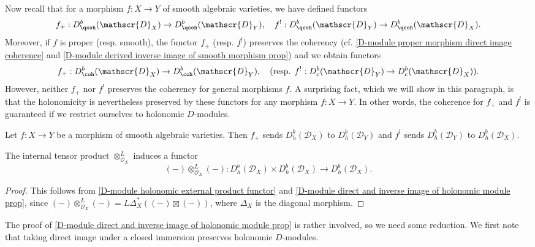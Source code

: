 Now recall that for a morphism $f:X\to Y$ of smooth algebraic varieties, we have defined functors
\[f_+:D^b_{\qcoh}(\mathscr{D}_X)\to D^b_{\qcoh}(\mathscr{D}_Y),\quad f^!:D^b_{\qcoh}(\mathscr{D}_Y)\to D^b_{\qcoh}(\mathscr{D}_X).\]
Moreover, if $f$ is proper (resp. smooth), the functor $f_+$ (resp. $f^!$) preserves the coherency (cf. \cref{D-module proper morphism direct image coherence} and \cref{D-module derived inverse image of smooth morphism prop}) and we obtain functors
\[f_+:D^b_{\coh}(\mathscr{D}_X)\to D^b_{\coh}(\mathscr{D}_Y),\quad \text{(resp. $f^!:D^b_c(\mathscr{D}_Y)\to D^b_c(\mathscr{D}_X)$)}.\]
However, neither $f_+$ nor $f^!$ preserves the coherency for general morphisms $f$. A surprising fact, which we will show in this paragraph, is that the holonomicity is nevertheless preserved by these functors for any morphism $f:X\to Y$. In other words, the coherence for $f_+$ and $f^!$ is guaranteed if we restrict ourselves to holonomic $D$-modules.

\begin{theorem}\label{D-module direct and inverse image of holonomic module prop}
Let $f:X\to Y$ be a morphism of smooth algebraic varieties. Then $f_+$ sends $D^b_h(\mathscr{D}_X)$ to $D^b_h(\mathscr{D}_Y)$ and $f^!$ sends $D^b_h(\mathscr{D}_Y)$ to $D^b_h(\mathscr{D}_X)$.
\end{theorem}
\begin{corollary}\label{D-module holonomic tensor product is holonomic}
The internal tensor product $\otimes_{\mathscr{O}_X}^L$ induces a functor
\[(-)\otimes_{\mathscr{O}_X}^L(-):D^b_h(\mathscr{D}_X)\times D^b_h(\mathscr{D}_X)\to D^b_h(\mathscr{D}_X).\]
\end{corollary}
\begin{proof}
This follows from \cref{D-module holonomic external product functor} and \cref{D-module direct and inverse image of holonomic module prop}, since $(-)\otimes_{\mathscr{O}_X}^L(-)=L\Delta_X^*((-)\boxtimes(-))$, where $\Delta_X$ is the diagonal morphism.
\end{proof}

The proof of \cref{D-module direct and inverse image of holonomic module prop} is rather involved, so we need some reduction. We first note that taking direct image under a closed immersion preserves holonomic $D$-modules.

